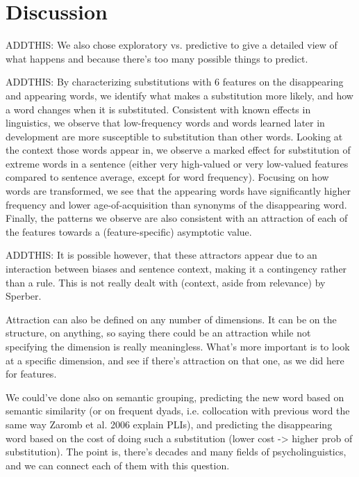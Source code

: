 \section{Discussion}





\begin{new}

ADDTHIS:
We also chose exploratory vs. predictive to give a detailed view of what happens and because there's too many possible things to predict.

ADDTHIS:
By characterizing substitutions with 6 features on the disappearing and appearing words, we identify what makes a substitution more likely, and how a word changes when it is substituted.
Consistent with known effects in linguistics, we observe that low-frequency words and words learned later in development are more susceptible to substitution than other words.
Looking at the context those words appear in, we observe a marked effect for substitution of extreme words in a sentence (either very high-valued or very low-valued features compared to sentence average, except for word frequency).
Focusing on how words are transformed, we see that the appearing words have significantly higher frequency and lower age-of-acquisition than synonyms of the disappearing word.
Finally, the patterns we observe are also consistent with an attraction of each of the features towards a (feature-specific) asymptotic value.

ADDTHIS:
It is possible however, that these attractors appear due to an interaction between biases and sentence context, making it a contingency rather than a rule. This is not really dealt with (context, aside from relevance) by Sperber.

Attraction can also be defined on any number of dimensions. It can be on the structure, on anything, so saying there could be an attraction while not specifying the dimension is really meaningless. What's more important is to look at a specific dimension, and see if there's attraction on that one, as we did here for features.

We could've done also on semantic grouping, predicting the new word based on semantic similarity (or on frequent dyads, i.e. collocation with previous word the same way Zaromb et al. 2006 explain PLIs), and predicting the disappearing word based on the cost of doing such a substitution (lower cost -> higher prob of substitution). The point is, there's decades and many fields of psycholinguistics, and we can connect each of them with this question.


\end{new}
